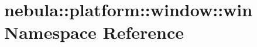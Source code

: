 \hypertarget{namespacenebula_1_1platform_1_1window_1_1win}{
\section{nebula::platform::window::win Namespace Reference}
\label{namespacenebula_1_1platform_1_1window_1_1win}
}
